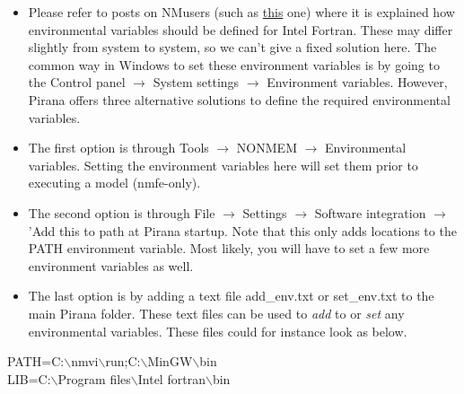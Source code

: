 \begin{itemize}
\item Please refer to posts on NMusers (such as
  \href{'http://www.cognigencorp.com/nonmem/current/2009-October/2077.html''}{this}
  one) where it is explained how environmental variables should be
  defined for Intel Fortran. These may differ slightly from system to
  system, so we can't give a fixed solution here. The common way in
  Windows to set these environment variables is by going to the
  Control panel $\rightarrow$ System settings $\rightarrow$
  Environment variables.  However, Pirana offers three alternative
  solutions to define the required environmental variables.
\item The first option is through Tools $\rightarrow$ NONMEM
  $\rightarrow$ Environmental variables. Setting the environment
  variables here will set them prior to executing a model (nmfe-only).
\item The second option is through File $\rightarrow$ Settings
  $\rightarrow$ Software integration $\rightarrow$ 'Add this to path
  at Pirana startup. Note that this only adds locations to the PATH
  environment variable. Most likely, you will have to set a few more
  environment variables as well.
\item The last option is by adding a text file add\_env.txt or
  set\_env.txt to the main Pirana folder. These text files can be used
  to \emph{add} to or \emph{set} any environmental variables. These
  files could for instance look as below.
\end{itemize}
   {\colorbox{grey2}{
         \begin{minipage}[t]{0.5\textwidth}
          {\ttfamily
   PATH=C:$\backslash$nmvi$\backslash$run;C:$\backslash$MinGW$\backslash$bin\\
   LIB=C:$\backslash$Program files$\backslash$Intel
   fortran$\backslash$bin
}
          \end{minipage}
      }
   }

